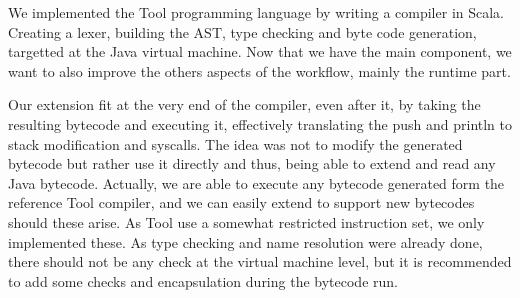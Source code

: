 We implemented the Tool programming language by writing a compiler in Scala.
Creating a lexer, building the AST, type checking and byte code generation,
targetted at the Java virtual machine. Now that we have the main component, we
want to also improve the others aspects of the workflow, mainly the runtime
part.

Our extension fit at the very end of the compiler, even after it, by taking the
resulting bytecode and executing it, effectively translating the push and
println to stack modification and syscalls. The idea was not to modify the
generated bytecode but rather use it directly and thus, being able to extend and
read any Java bytecode. Actually, we are able to execute any bytecode generated
form the reference Tool compiler, and we can easily extend to support new
bytecodes should these arise. As Tool use a somewhat restricted instruction set,
we only implemented these. As type checking and name resolution were already
done, there should not be any check at the virtual machine level, but it is
recommended to add some checks and encapsulation during the bytecode run.
